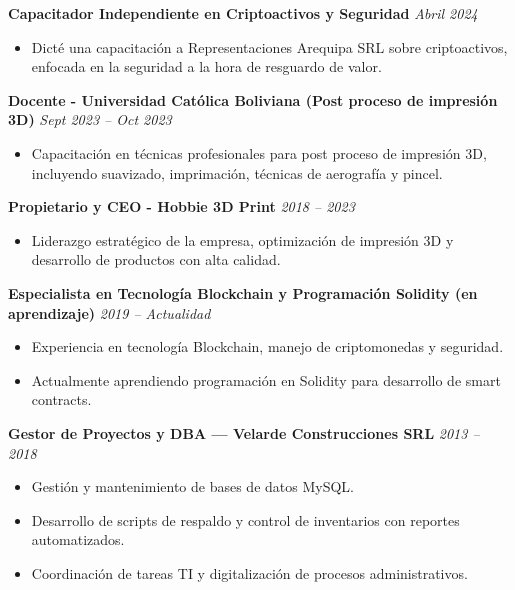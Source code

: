 \documentclass[a4paper,10pt]{article}
\begin{document}
\vspace{5pt}


\textbf{Capacitador Independiente en Criptoactivos y Seguridad} \hfill \textit{Abril 2024} \\
\begin{itemize}[leftmargin=*]
    \item Dicté una capacitación a Representaciones Arequipa SRL sobre criptoactivos, enfocada en la seguridad a la hora de resguardo de valor.
\end{itemize}

\vspace{5pt}

\textbf{Docente - Universidad Católica Boliviana (Post proceso de impresión 3D)} \hfill \textit{Sept 2023 – Oct 2023} \\
\begin{itemize}[leftmargin=*]
    \item Capacitación en técnicas profesionales para post proceso de impresión 3D, incluyendo suavizado, imprimación, técnicas de aerografía y pincel.
\end{itemize}

\vspace{5pt}

\textbf{Propietario y CEO - Hobbie 3D Print} \hfill \textit{2018 – 2023} \\
\begin{itemize}[leftmargin=*]
    \item Liderazgo estratégico de la empresa, optimización de impresión 3D y desarrollo de productos con alta calidad.
\end{itemize}

\vspace{5pt}

\textbf{Especialista en Tecnología Blockchain y Programación Solidity (en aprendizaje)} \hfill \textit{2019 – Actualidad} \\
\begin{itemize}[leftmargin=*]
    \item Experiencia en tecnología Blockchain, manejo de criptomonedas y seguridad.
    \item Actualmente aprendiendo programación en Solidity para desarrollo de smart contracts.
\end{itemize}

\vspace{5pt}

\textbf{Gestor de Proyectos y DBA — Velarde Construcciones SRL} \hfill \textit{2013 – 2018} \\
\begin{itemize}[leftmargin=*]
    \item Gestión y mantenimiento de bases de datos MySQL.
    \item Desarrollo de scripts de respaldo y control de inventarios con reportes automatizados.
    \item Coordinación de tareas TI y digitalización de procesos administrativos.
\end{itemize}
\end{document}
